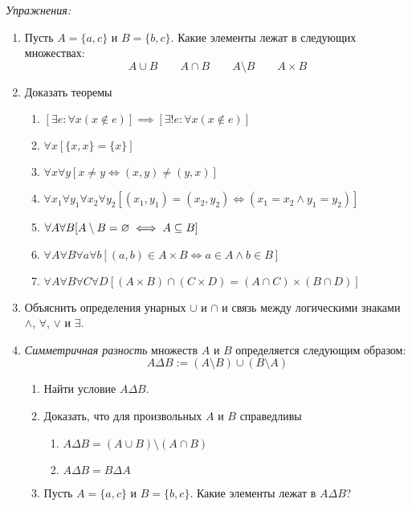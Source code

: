 \vspace{1em}
{\it Упражнения:}
\begin{enumerate}
	\item{}Пусть $A=\{a,c\}$ и $B=\{b,c\}$. Какие элементы лежат в следующих
	множествах:
	\[
		A\cup B\qquad A\cap B\qquad A\setminus B\qquad
		A\times B
	\]
	\item{}Доказать теоремы
	\begin{enumerate}
		\item{}$[\exists e:\forall x(x\notin e)]\implies
			[\exists!e:\forall x(x\notin e)]$ \label{ex:eset_only}
		\item{}$\forall x[\{x,x\}=\{x\}]$
		\item{}$\forall x\forall y[x\neq y\iff (x,y)\neq (y,x)]$
		\item{}$\forall x_1\forall y_1\forall x_2\forall y_2
			[(x_1,y_1)=(x_2,y_2)\iff (x_1=x_2\land y_1=y_2)]$
		\item{}$\forall A\forall B[A\setminus B=\varnothing\iff A\subseteq B]$
		\item{}$\forall A\forall B\forall a\forall b
				[(a,b)\in A\times B\iff a\in A\land b\in B]$
		\item{}$\forall A\forall B\forall C\forall D
				[(A\times B)\cap (C\times D)=(A\cap C)\times (B\cap D)]$
	\end{enumerate}
	\item{}Объяснить определения унарных $\cup$ и $\cap$
	и связь между логическими знаками $\land$, $\forall$, $\lor$ и $\exists$.
	\item{}{\it Симметричная разность} множеств $A$ и $B$ определяется следующим образом:
	\[
		A\Delta B:=(A\setminus B)\cup (B\setminus A)
	\]
	\begin{enumerate}
		\item{}Найти условие $A\Delta B$.
		\item{}Доказать, что для произвольных $A$ и $B$ справедливы
		\begin{enumerate}
			\item{}$A\Delta B=(A\cup B)\setminus (A\cap B)$
			\item{}$A\Delta B=B\Delta A$
		\end{enumerate}
		\item{}Пусть $A=\{a,c\}$ и $B=\{b,c\}$. Какие элементы лежат в $A\Delta B$?
	\end{enumerate}
\end{enumerate}
